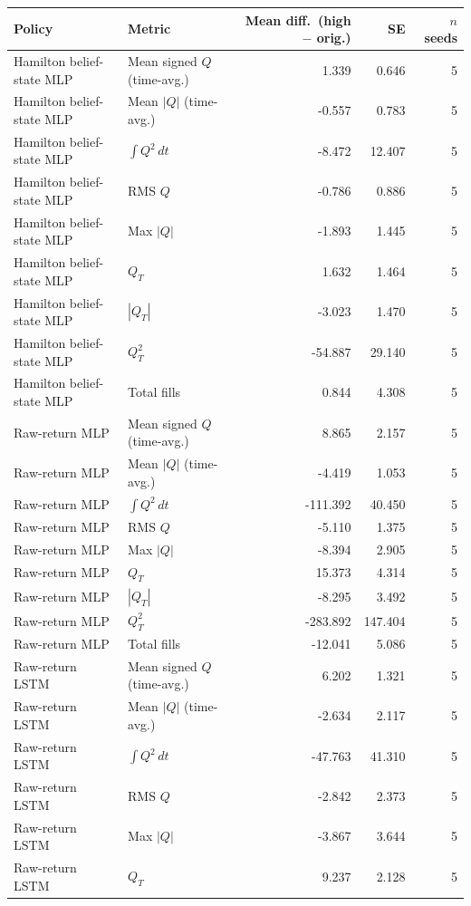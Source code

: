 \begin{table}[ht]
\centering
\small
\begin{tabular}{llrrr}
\toprule
Policy & Metric & Mean diff.\ (high $-$ orig.) & SE & $n$ seeds \\
\midrule
Hamilton belief-state MLP & Mean signed $Q$ (time-avg.) & 1.339 & 0.646 & 5 \\
Hamilton belief-state MLP & Mean $|Q|$ (time-avg.) & -0.557 & 0.783 & 5 \\
Hamilton belief-state MLP & $\int Q^2\,dt$ & -8.472 & 12.407 & 5 \\
Hamilton belief-state MLP & RMS $Q$ & -0.786 & 0.886 & 5 \\
Hamilton belief-state MLP & Max $|Q|$ & -1.893 & 1.445 & 5 \\
Hamilton belief-state MLP & $Q_T$ & 1.632 & 1.464 & 5 \\
Hamilton belief-state MLP & $|Q_T|$ & -3.023 & 1.470 & 5 \\
Hamilton belief-state MLP & $Q_T^2$ & -54.887 & 29.140 & 5 \\
Hamilton belief-state MLP & Total fills & 0.844 & 4.308 & 5 \\
Raw-return MLP & Mean signed $Q$ (time-avg.) & 8.865 & 2.157 & 5 \\
Raw-return MLP & Mean $|Q|$ (time-avg.) & -4.419 & 1.053 & 5 \\
Raw-return MLP & $\int Q^2\,dt$ & -111.392 & 40.450 & 5 \\
Raw-return MLP & RMS $Q$ & -5.110 & 1.375 & 5 \\
Raw-return MLP & Max $|Q|$ & -8.394 & 2.905 & 5 \\
Raw-return MLP & $Q_T$ & 15.373 & 4.314 & 5 \\
Raw-return MLP & $|Q_T|$ & -8.295 & 3.492 & 5 \\
Raw-return MLP & $Q_T^2$ & -283.892 & 147.404 & 5 \\
Raw-return MLP & Total fills & -12.041 & 5.086 & 5 \\
Raw-return LSTM & Mean signed $Q$ (time-avg.) & 6.202 & 1.321 & 5 \\
Raw-return LSTM & Mean $|Q|$ (time-avg.) & -2.634 & 2.117 & 5 \\
Raw-return LSTM & $\int Q^2\,dt$ & -47.763 & 41.310 & 5 \\
Raw-return LSTM & RMS $Q$ & -2.842 & 2.373 & 5 \\
Raw-return LSTM & Max $|Q|$ & -3.867 & 3.644 & 5 \\
Raw-return LSTM & $Q_T$ & 9.237 & 2.128 & 5 \\

\end{tabular}
\end{table}
